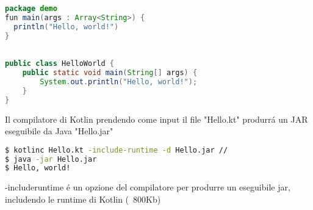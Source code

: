 \begin{lstlisting}[language=java,caption={Hello.kt in Kotlin}]
package demo
fun main(args : Array<String>) {
  println("Hello, world!")
}
\end{lstlisting}

\begin{lstlisting}[language=java,caption={Hello.java in Java}]

public class HelloWorld {
    public static void main(String[] args) {
        System.out.println("Hello, world!");
    }
}
\end{lstlisting}

Il compilatore di Kotlin prendendo come input il file "Hello.kt" produrr\'a un JAR eseguibile da Java "Hello.jar"


\begin{lstlisting}[language=bash,caption={Compilatore kotlin}]
$ kotlinc Hello.kt -include-runtime -d Hello.jar //
$ java -jar Hello.jar
$ Hello, world!
\end{lstlisting}

 -includeruntime \'e un opzione del compilatore per produrre un eseguibile jar, includendo le runtime di Kotlin (~800Kb)
%
%
%


%
%
%
%





